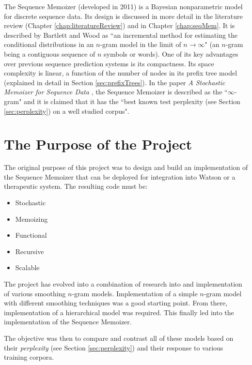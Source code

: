 The Sequence Memoizer (developed in 2011) is a Bayesian nonparametric model for discrete sequence data. Its design is discussed in more detail in the literature review (Chapter \ref{chap:literatureReview}) and in Chapter \ref{chap:seqMem}. It is described by Bartlett and Wood \cite{bartlett2011deplump} as ``an incremental method for estimating the conditional distributions in an $n$-gram model in the limit of $n\to\infty$" (an $n$-gram being a contiguous sequence of $n$ symbols or words). One of its key advantages over previous sequence prediction systems is its compactness. Its space complexity is linear, a function of the number of nodes in its prefix tree model (explained in detail in Section \ref{sec:prefixTrees}). In the paper \textit{A Stochastic Memoizer for Sequence Data} \cite{wood2009stochastic}, the Sequence Memoizer is described as the ``$\infty$-gram" and it is claimed that it has the ``best known test perplexity (see Section \ref{sec:perplexity}) on a well studied corpus". 




\section{The Purpose of the Project}



The original purpose of this project was to design and build an implementation of the Sequence Memoizer that can be deployed for integration into Watson or a therapeutic system. The resulting code must be:

\begin{itemize}
\item Stochastic
\item Memoizing
\item Functional
\item Recursive
\item Scalable
\end{itemize}

The project has evolved into a combination of research into and implementation of various smoothing $n$-gram models. Implementation of a simple $n$-gram model with different smoothing techniques was a good starting point. From there, implementation of a hierarchical model was required. This finally led into the implementation of the Sequence Memoizer.

The objective was then to compare and contrast all of these models based on their \textit{perplexity} (see Section \ref{sec:perplexity}) and their response to various training corpora. 



%

